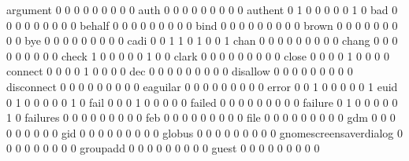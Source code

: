 \documentclass[compress,8pt]{beamer}
\begin{document}
\begin{frame}
\begin{Schunk}
  argument                                   0   0   0   0   0   0   0   0   0
  auth                                       0   0   0   0   0   0   0   0   0
  authent                                    0   1   0   0   0   0   0   1   0
  bad                                        0   0   0   0   0   0   0   0   0
  behalf                                     0   0   0   0   0   0   0   0   0
  bind                                       0   0   0   0   0   0   0   0   0
  brown                                      0   0   0   0   0   0   0   0   0
  bye                                        0   0   0   0   0   0   0   0   0
  cadi                                       0   0   1   1   0   1   0   0   1
  chan                                       0   0   0   0   0   0   0   0   0
  chang                                      0   0   0   0   0   0   0   0   0
  check                                      1   0   0   0   0   0   1   0   0
  clark                                      0   0   0   0   0   0   0   0   0
  close                                      0   0   0   0   1   0   0   0   0
  connect                                    0   0   0   0   1   0   0   0   0
  dec                                        0   0   0   0   0   0   0   0   0
  disallow                                   0   0   0   0   0   0   0   0   0
  disconnect                                 0   0   0   0   0   0   0   0   0
  eaguilar                                   0   0   0   0   0   0   0   0   0
  error                                      0   0   1   0   0   0   0   0   1
  euid                                       0   1   0   0   0   0   0   1   0
  fail                                       0   0   0   1   0   0   0   0   0
  failed                                     0   0   0   0   0   0   0   0   0
  failure                                    0   1   0   0   0   0   0   1   0
  failures                                   0   0   0   0   0   0   0   0   0
  feb                                        0   0   0   0   0   0   0   0   0
  file                                       0   0   0   0   0   0   0   0   0
  gdm                                        0   0   0   0   0   0   0   0   0
  gid                                        0   0   0   0   0   0   0   0   0
  globus                                     0   0   0   0   0   0   0   0   0
  gnomescreensaverdialog                     0   0   0   0   0   0   0   0   0
  groupadd                                   0   0   0   0   0   0   0   0   0
  guest                                      0   0   0   0   0   0   0   0   0

\end{Schunk}
\end{frame}
\end{document}
